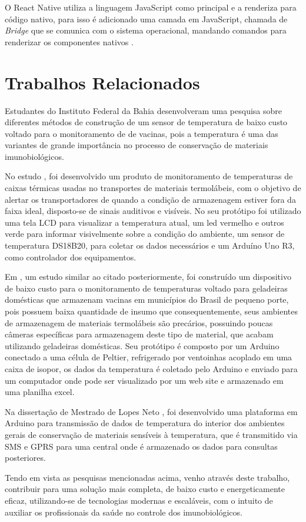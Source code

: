 O React Native utiliza a linguagem JavaScript como principal e a renderiza para código nativo, para isso é adicionado uma camada em JavaScript, chamada de \textit{Bridge} que se comunica com o sistema operacional, mandando comandos para renderizar os componentes nativos \cite{docreactnative}.

\section{Trabalhos Relacionados}
\label{fund:trabalhos-relacionados}
Estudantes do Instituto Federal da Bahia desenvolveram uma pesquisa \cite{cruzdesenvolvimento} sobre diferentes métodos de construção de um sensor de temperatura de baixo custo voltado para o monitoramento de de vacinas, pois a temperatura é uma das variantes de grande importância no  processo de conservação de materiais imunobiológicos.

No estudo \cite{lima2019controle}, foi desenvolvido um produto de monitoramento de temperaturas de caixas térmicas usadas no transportes de materiais termolábeis, com o  objetivo de alertar os transportadores de quando a condição de armazenagem estiver fora da faixa ideal, disposto-se de sinais auditivos e visíveis. No seu protótipo foi utilizado uma tela LCD para visualizar a temperatura atual, um led vermelho e outros verde para informar visivelmente sobre a condição do ambiente, um sensor de temperatura DS18B20, para coletar os dados necessários e um Arduíno Uno R3, como controlador dos equipamentos.

Em \cite{kersbaum2019monitoramento}, um estudo similar ao citado posteriormente, foi construído um dispositivo de baixo custo para o monitoramento de temperaturas voltado para geladeiras domésticas que armazenam vacinas em municípios do Brasil de pequeno porte, pois possuem baixa quantidade de insumo que consequentemente, seus ambientes de armazenagem de materiais termolábeis são precários, possuindo poucas câmeras específicas para armazenagem deste tipo de material, que acabam utilizando geladeiras domésticas. Seu protótipo é composto por um Arduino conectado a uma célula de Peltier, refrigerado por ventoinhas acoplado em uma caixa de isopor, os dados da temperatura é coletado pelo Arduino e enviado para um computador onde pode ser visualizado por um web site e armazenado em uma planilha excel.

Na dissertação de Mestrado de Lopes Neto \cite{lopes2019monitoramento}, foi desenvolvido uma plataforma em Arduino para transmissão de dados de temperatura do interior dos ambientes gerais de conservação de materiais sensíveis à temperatura, que é transmitido via SMS e GPRS para uma central onde é armazenado os dados para consultas posteriores.

Tendo em vista as pesquisas mencionadas acima, venho através deste trabalho, contribuir para uma solução mais completa, de baixo custo e energeticamente eficaz, utilizando-se de tecnologias modernas e escaláveis, com o intuito de auxiliar os profissionais da saúde no controle dos imunobiológicos.